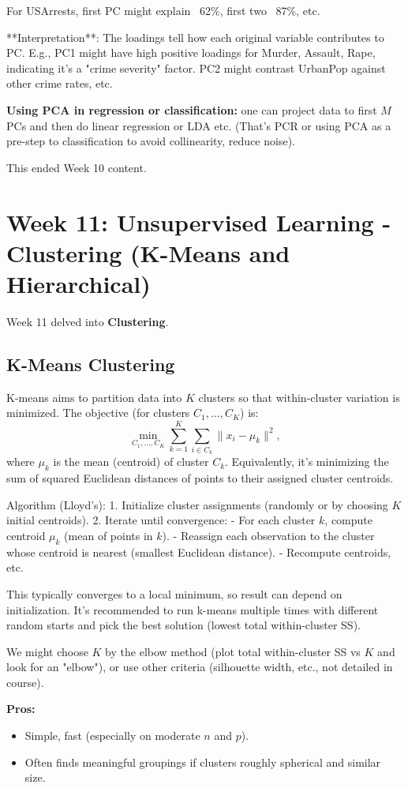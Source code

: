 \documentclass[11pt]{article}
\begin{document}
For USArrests, first PC might explain ~62\%, first two ~87\%, etc.

**Interpretation**: The loadings tell how each original variable contributes to PC. E.g., PC1 might have high positive loadings for Murder, Assault, Rape, indicating it's a "crime severity" factor. PC2 might contrast UrbanPop against other crime rates, etc.

\textbf{Using PCA in regression or classification:} one can project data to first $M$ PCs and then do linear regression or LDA etc. (That's PCR or using PCA as a pre-step to classification to avoid collinearity, reduce noise).

This ended Week 10 content.

\section{Week 11: Unsupervised Learning - Clustering (K-Means and Hierarchical)}
Week 11 delved into \textbf{Clustering}.

\subsection{K-Means Clustering}
K-means aims to partition data into $K$ clusters so that within-cluster variation is minimized. The objective (for clusters $C_1, \ldots, C_K$) is:
\[ \min_{C_1,\ldots,C_K} \sum_{k=1}^K \sum_{i \in C_k} \|x_i - \mu_k\|^2, \]
where $\mu_k$ is the mean (centroid) of cluster $C_k$. Equivalently, it's minimizing the sum of squared Euclidean distances of points to their assigned cluster centroids.

Algorithm (Lloyd's):
1. Initialize cluster assignments (randomly or by choosing $K$ initial centroids).
2. Iterate until convergence:
   - For each cluster $k$, compute centroid $\mu_k$ (mean of points in $k$).
   - Reassign each observation to the cluster whose centroid is nearest (smallest Euclidean distance).
   - Recompute centroids, etc.

This typically converges to a local minimum, so result can depend on initialization. It's recommended to run k-means multiple times with different random starts and pick the best solution (lowest total within-cluster SS).

We might choose $K$ by the elbow method (plot total within-cluster SS vs $K$ and look for an "elbow"), or use other criteria (silhouette width, etc., not detailed in course).

\noindent \textbf{Pros:}
\begin{itemize}
    \item Simple, fast (especially on moderate $n$ and $p$).
    \item Often finds meaningful groupings if clusters roughly spherical and similar size.
\end{itemize}
\end{document}
